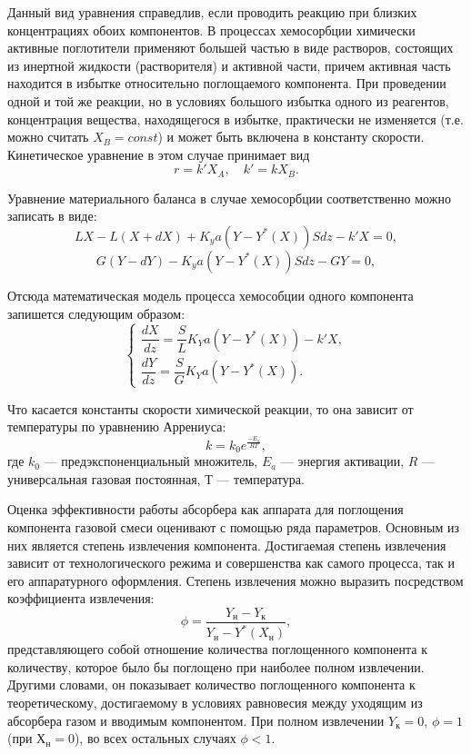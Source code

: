 Данный вид уравнения справедлив, если проводить реакцию при близких концентрациях обоих компонентов. В процессах хемосорбции химически активные поглотители применяют большей частью в виде растворов, состоящих из инертной жидкости (растворителя) и активной части, причем активная часть находится в избытке относительно поглощаемого компонента. При проведении одной и той же реакции, но в условиях большого избытка одного из реагентов, концентрация вещества, находящегося в избытке, практически не изменяется (т.е. можно считать $X_B=const$) и может быть включена в константу скорости. Кинетическое уравнение в этом случае принимает вид
\begin{equation}
r=k' X_A, \quad k'=k X_B.
\end{equation}

Уравнение материального баланса в случае хемосорбции соответственно можно записать в виде:
\begin{equation}
L X - L(X +dX) + K_y a (Y-Y^*(X))Sdz-k'X=0, 
\end{equation}
\begin{equation}
G(Y-dY)-K_y a (Y-Y^*(X))Sdz- GY=0,
\end{equation}

Отсюда математическая модель процесса хемособции одного компонента запишется следующим образом:
\begin{equation}
\left\lbrace 
\begin{gathered} 
\dfrac{dX}{dz}=\dfrac{S}{L} K_Y a (Y-Y^*(X))-k'X,
\\
\dfrac{dY}{dz}=\dfrac{S}{G} K_Y a (Y-Y^*(X)).
\end{gathered} 
\right.
\end{equation}

Что касается константы скорости химической реакции, то она зависит от температуры по уравнению Аррениуса:
\begin{equation}
	k=k_0 e^{\frac{-E_a}{RT}},
\end{equation}
где $k_0$ --- предэкспоненциальный множитель, $E_a$ --- энергия активации, $R$ --- универсальная газовая постоянная, $Т$ --- температура. 

Оценка эффективности работы абсорбера как аппарата для поглощения компонента газовой смеси оценивают с помощью ряда параметров. Основным из них является степень извлечения компонента. Достигаемая степень извлечения зависит от технологического режима и совершенства как самого процесса, так и его аппаратурного оформления. Степень извлечения можно выразить посредством коэффициента извлечения:
\begin{equation}
	\phi =\dfrac{Y_н - Y_к}{Y_н - Y^*(X_н)},
\end{equation}
представляющего собой отношение количества поглощенного компонента к количеству, которое было бы поглощено при наиболее полном извлечении. Другими словами, он показывает количество поглощенного компонента к теоретическому, достигаемому в условиях равновесия между уходящим из абсорбера газом и вводимым компонентом. При полном извлечении $Y_к=0$, $\phi=1$ (при $Х_н=0$), во всех остальных случаях $\phi<1$.
 
